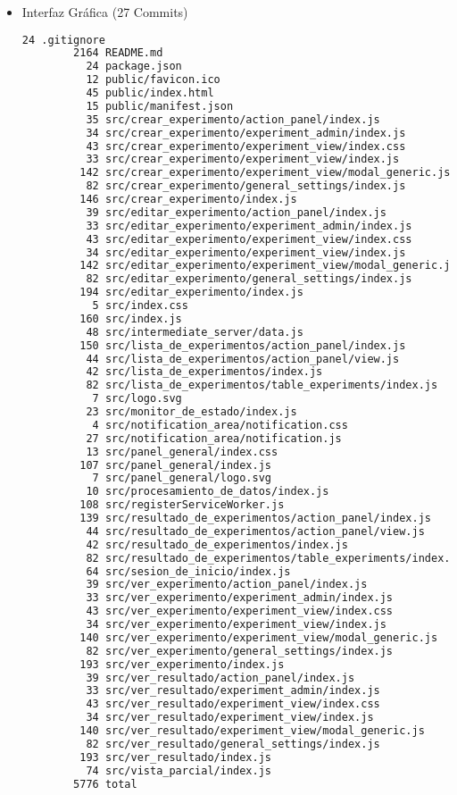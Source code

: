 \begin{itemize}
\item Interfaz Gr\'afica (27 Commits)
\begin{lstlisting}[language=bash]
        24 .gitignore
        2164 README.md
          24 package.json
          12 public/favicon.ico
          45 public/index.html
          15 public/manifest.json
          35 src/crear_experimento/action_panel/index.js
          34 src/crear_experimento/experiment_admin/index.js
          43 src/crear_experimento/experiment_view/index.css
          33 src/crear_experimento/experiment_view/index.js
         142 src/crear_experimento/experiment_view/modal_generic.js
          82 src/crear_experimento/general_settings/index.js
         146 src/crear_experimento/index.js
          39 src/editar_experimento/action_panel/index.js
          33 src/editar_experimento/experiment_admin/index.js
          43 src/editar_experimento/experiment_view/index.css
          34 src/editar_experimento/experiment_view/index.js
         142 src/editar_experimento/experiment_view/modal_generic.js
          82 src/editar_experimento/general_settings/index.js
         194 src/editar_experimento/index.js
           5 src/index.css
         160 src/index.js
          48 src/intermediate_server/data.js
         150 src/lista_de_experimentos/action_panel/index.js
          44 src/lista_de_experimentos/action_panel/view.js
          42 src/lista_de_experimentos/index.js
          82 src/lista_de_experimentos/table_experiments/index.js
           7 src/logo.svg
          23 src/monitor_de_estado/index.js
           4 src/notification_area/notification.css
          27 src/notification_area/notification.js
          13 src/panel_general/index.css
         107 src/panel_general/index.js
           7 src/panel_general/logo.svg
          10 src/procesamiento_de_datos/index.js
         108 src/registerServiceWorker.js
         139 src/resultado_de_experimentos/action_panel/index.js
          44 src/resultado_de_experimentos/action_panel/view.js
          42 src/resultado_de_experimentos/index.js
          82 src/resultado_de_experimentos/table_experiments/index.js
          64 src/sesion_de_inicio/index.js
          39 src/ver_experimento/action_panel/index.js
          33 src/ver_experimento/experiment_admin/index.js
          43 src/ver_experimento/experiment_view/index.css
          34 src/ver_experimento/experiment_view/index.js
         140 src/ver_experimento/experiment_view/modal_generic.js
          82 src/ver_experimento/general_settings/index.js
         193 src/ver_experimento/index.js
          39 src/ver_resultado/action_panel/index.js
          33 src/ver_resultado/experiment_admin/index.js
          43 src/ver_resultado/experiment_view/index.css
          34 src/ver_resultado/experiment_view/index.js
         140 src/ver_resultado/experiment_view/modal_generic.js
          82 src/ver_resultado/general_settings/index.js
         193 src/ver_resultado/index.js
          74 src/vista_parcial/index.js
        5776 total
    \end{lstlisting}
    

\end{itemize}
